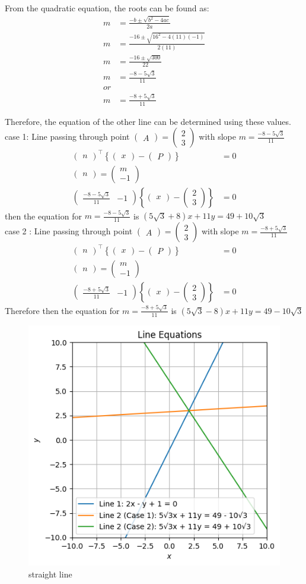 \documentclass[10pt]{article}
\newcommand{\myvec}[1]{\ensuremath{\begin{pmatrix}#1\end{pmatrix}}}
\providecommand{\cbrak}[1]{\ensuremath{\left\{#1\right\}}}
\begin{document}
From the quadratic equation, the roots can be found as:
\begin{align}
m &= \frac{-b \pm \sqrt{b^2 - 4ac}}{2a} \\
m &= \frac{-16 \pm \sqrt{16^2 - 4(11)(-1)}}{2(11)} \\
m &= \frac{-16 \pm \sqrt{300}}{22} \\
m &= \frac{-8 - 5\sqrt{3}}{11} \\
or\\ 
m &= \frac{-8 + 5\sqrt{3}}{11} 
\end{align}

Therefore, the equation of the other line can be determined using these values.
\\
case 1: Line passing through point $\myvec{A} = \myvec{ 2 \\ 3 }$ with slope $m=\frac{-8 - 5\sqrt{3}}{11}$
\begin{align}
    \myvec{n}^\top\cbrak{{\myvec{x}-\myvec{P}}}&= 0 \\
    \myvec{n} = \myvec{ m \\ -1 } \\
    \myvec{ \frac{-8 - 5\sqrt{3}}{11} & -1 }\cbrak{\myvec{x}-\myvec{ 2 \\ 3 }} &= 0
\end{align}
then the equation for $m=\frac{-8 - 5\sqrt{3}}{11}$ is   $(5\sqrt{3}+8)x+11y=49+10\sqrt{3}$
\\
case 2 : Line passing through point $\myvec{A} = \myvec{ 2 \\ 3 }$ with slope $m =\frac{-8 + 5\sqrt{3}}{11}$
\begin{align}
     \myvec{n}^\top\cbrak{{\myvec{x}-\myvec{P}}}&= 0 \\
    \myvec{n} = \myvec{ m \\ -1 } \\
    \myvec{ \frac{-8 + 5\sqrt{3}}{11} & -1 }\cbrak{\myvec{x}-\myvec{ 2 \\ 3 }} &= 0
\end{align}
Therefore then  the equation for $m=\frac{-8 + 5\sqrt{3}}{11}$ is   $(5\sqrt{3}-8)x+11y=49-10\sqrt{3}$

\begin{figure}
    \centering
    \includegraphics[width=\columnwidth]{line.png}
    \caption{straight line}
    \label{fig:enter-label}
\end{figure}
\end{document}
